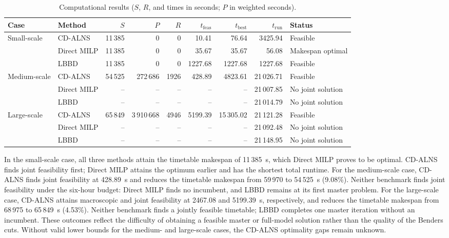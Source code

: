 \begin{table}[tb]
\centering\small
\caption{Computational results ($S$, $R$, and times in seconds; $P$ in weighted seconds).}\label{tab:results}
\footnotesize\setlength{\tabcolsep}{3.2pt}
\begin{tabular}{@{}llrrrrrrl@{}}\toprule
Case & Method & $S$ & $P$ & $R$ & $t_{\mathrm{feas}}$ & $t_{\mathrm{best}}$ & $t_{\mathrm{run}}$ & Status\\\midrule
Small-scale & CD-ALNS & 11\,385 & 0 & 0 & 10.41 & 76.64 & 3425.94 & Feasible\\
 & Direct MILP & 11\,385 & 0 & 0 & 35.67 & 35.67 & 56.08 & Makespan optimal\\
 & LBBD & 11\,385 & 0 & 0 & 1227.68 & 1227.68 & 1227.68 & Feasible\\\midrule
Medium-scale & CD-ALNS & 54\,525 & 272\,686 & 1926 & 428.89 & 4823.61 & 21\,026.71 & Feasible\\
 & Direct MILP & -- & -- & -- & -- & -- & 21\,007.85 & No joint solution\\
 & LBBD & -- & -- & -- & -- & -- & 21\,014.79 & No joint solution\\\midrule
Large-scale & CD-ALNS & 65\,849 & 3\,910\,668 & 4946 & 5199.39 & 15\,305.02 & 21\,121.28 & Feasible\\
 & Direct MILP & -- & -- & -- & -- & -- & 21\,092.48 & No joint solution\\
 & LBBD & -- & -- & -- & -- & -- & 21\,148.95 & No joint solution\\\bottomrule
\end{tabular}
\end{table}

In the small-scale case, all three methods attain the timetable makespan of 11\,385~s, which Direct MILP proves to be optimal. CD-ALNS finds joint feasibility first; Direct MILP attains the optimum earlier and has the shortest total runtime. For the medium-scale case, CD-ALNS finds joint feasibility at 428.89~s and reduces the timetable makespan from 59\,970 to 54\,525~s (9.08\%). Neither benchmark finds joint feasibility under the six-hour budget: Direct MILP finds no incumbent, and LBBD remains at its first master problem. For the large-scale case, CD-ALNS attains macroscopic and joint feasibility at 2467.08 and 5199.39~s, respectively, and reduces the timetable makespan from 68\,975 to 65\,849~s (4.53\%). Neither benchmark finds a jointly feasible timetable; LBBD completes one master iteration without an incumbent. These outcomes reflect the difficulty of obtaining a feasible master or full-model solution rather than the quality of the Benders cuts. Without valid lower bounds for the medium- and large-scale cases, the CD-ALNS optimality gaps remain unknown.

